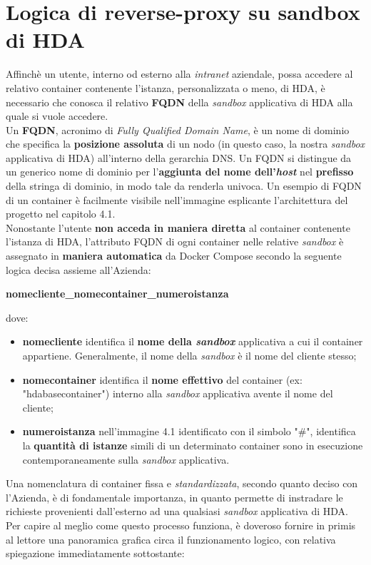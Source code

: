 \section{Logica di reverse-proxy su sandbox di HDA}
Affinchè un utente, interno od esterno alla \textit{intranet} aziendale, possa accedere al relativo container contenente l'istanza, personalizzata o meno, di HDA, è necessario che conosca il relativo \textbf{FQDN} della \textit{sandbox} applicativa di HDA alla quale si vuole accedere.\\
Un \textbf{FQDN}, acronimo di \textit{Fully Qualified Domain Name}, è un nome di dominio che specifica la \textbf{posizione assoluta} di un nodo (in questo caso, la nostra \textit{sandbox} applicativa di HDA) all'interno della gerarchia DNS. Un FQDN si distingue da un generico nome di dominio per l'\textbf{aggiunta del nome dell'\textit{host}} nel \textbf{prefisso} della stringa di dominio, in modo tale da renderla univoca. Un esempio di FQDN di un container è facilmente visibile nell'immagine esplicante l'architettura del progetto nel capitolo 4.1.\\
Nonostante l'utente \textbf{non acceda in maniera diretta} al container contenente l'istanza di HDA, l'attributo FQDN di ogni container nelle relative \textit{sandbox} è assegnato in \textbf{maniera automatica} da Docker Compose secondo la seguente logica decisa assieme all'Azienda:
\centerline{\textbf{nomecliente\_nomecontainer\_numeroistanza}}
dove:
\begin{itemize}
	\item \textbf{nomecliente} identifica il \textbf{nome della \textit{sandbox}} applicativa a cui il container appartiene. Generalmente, il nome della \textit{sandbox} è il nome del cliente stesso;
	\item \textbf{nomecontainer} identifica il \textbf{nome effettivo} del container (ex: "hdabasecontainer") interno alla \textit{sandbox} applicativa avente il nome del cliente;
	\item \textbf{numeroistanza} nell'immagine 4.1 identificato con il simbolo "\#", identifica la \textbf{quantità di istanze} simili di un determinato container sono in esecuzione contemporaneamente sulla \textit{sandbox} applicativa.
\end{itemize}
Una nomenclatura di container fissa e \textit{standardizzata}, secondo quanto deciso con l'Azienda, è di fondamentale importanza, in quanto permette di instradare le richieste provenienti dall'esterno ad una qualsiasi \textit{sandbox} applicativa di HDA.
Per capire al meglio come questo processo funziona, è doveroso fornire in primis al lettore una panoramica grafica circa il funzionamento logico, con relativa spiegazione immediatamente sottostante:
